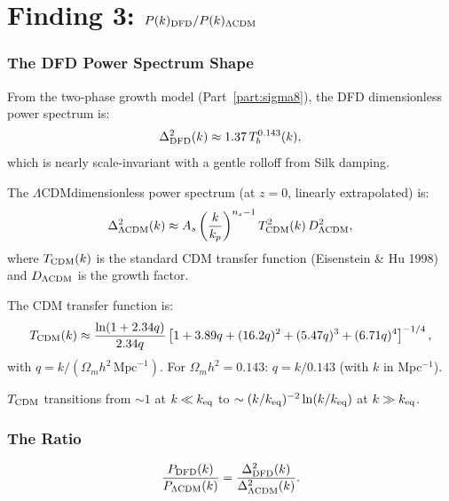 \documentclass[11pt]{article}
\newcommand{\LCDM}{$\Lambda$CDM}
\newcommand{\Om}{\Omega_m}
\begin{document}
\part{Finding 3: $P(k)_{\rm DFD}/P(k)_{\Lambda\rm CDM}$}
\label{part:Pk-ratio}

\section{The DFD Power Spectrum Shape}

From the two-phase growth model (Part~\ref{part:sigma8}), the DFD
dimensionless power spectrum is:
\begin{equation}
\Delta^2_{\rm DFD}(k) \approx 1.37\,T_b^{0.143}(k),
\label{eq:Delta-DFD}
\end{equation}
which is nearly scale-invariant with a gentle rolloff from Silk
damping.

The \LCDM dimensionless power spectrum (at $z = 0$, linearly
extrapolated) is:
\begin{equation}
\Delta^2_{\Lambda\rm CDM}(k) \approx A_s\left(\frac{k}{k_p}\right)^{n_s-1}
T_{\rm CDM}^2(k)\,D^2_{\Lambda\rm CDM},
\end{equation}
where $T_{\rm CDM}(k)$ is the standard CDM transfer function
(Eisenstein \& Hu 1998) and $D_{\Lambda\rm CDM}$ is the growth
factor.

The CDM transfer function is:
\begin{equation}
T_{\rm CDM}(k) \approx \frac{\ln(1+2.34q)}{2.34q}
\left[1 + 3.89q + (16.2q)^2 + (5.47q)^3 + (6.71q)^4\right]^{-1/4},
\end{equation}
with $q = k/(\Om h^2\,\text{Mpc}^{-1})$. For $\Om h^2 = 0.143$:
$q = k/0.143$ (with $k$ in Mpc$^{-1}$).

$T_{\rm CDM}$ transitions from $\sim 1$ at $k \ll k_{\rm eq}$ to
$\sim (k/k_{\rm eq})^{-2}\ln(k/k_{\rm eq})$ at $k \gg k_{\rm eq}$.

\section{The Ratio}

\begin{equation}
\frac{P_{\rm DFD}(k)}{P_{\Lambda\rm CDM}(k)}
= \frac{\Delta^2_{\rm DFD}(k)}{\Delta^2_{\Lambda\rm CDM}(k)}.
\label{eq:Pk-ratio}
\end{equation}
\end{document}
